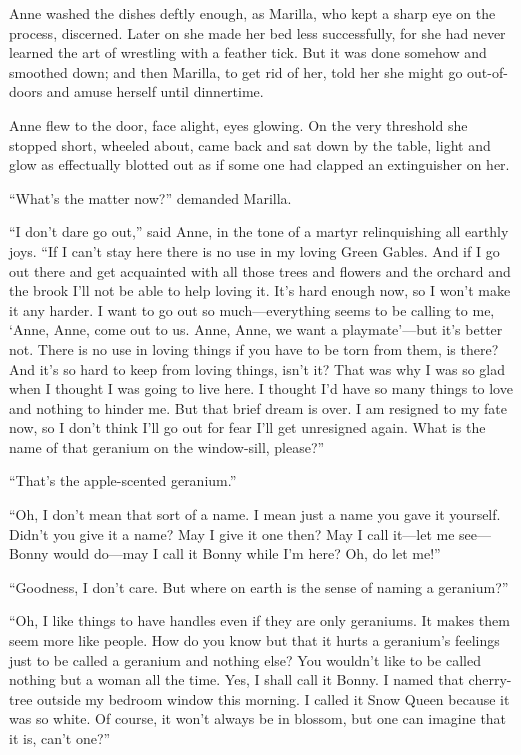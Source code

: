 \documentclass[a4paper]{article}
\begin{document}
\scriptsize{Anne washed the dishes deftly enough, as Marilla, who kept a sharp eye on the process, discerned. Later on she made her bed less successfully, for she had never learned the art of wrestling with a feather tick. But it was done somehow and smoothed down; and then Marilla, to get rid of her, told her she might go out-of-doors and amuse herself until dinnertime.

Anne flew to the door, face alight, eyes glowing. On the very threshold she stopped short, wheeled about, came back and sat down by the table, light and glow as effectually blotted out as if some one had clapped an extinguisher on her.

``What's the matter now?'' demanded Marilla.

``I don't dare go out,'' said Anne, in the tone of a martyr relinquishing all earthly joys. ``If I can't stay here there is no use in my loving Green Gables. And if I go out there and get acquainted with all those trees and flowers and the orchard and the brook I'll not be able to help loving it. It's hard enough now, so I won't make it any harder. I want to go out so much---everything seems to be calling to me, `Anne, Anne, come out to us. Anne, Anne, we want a playmate'---but it's better not. There is no use in loving things if you have to be torn from them, is there? And it's so hard to keep from loving things, isn't it? That was why I was so glad when I thought I was going to live here. I thought I'd have so many things to love and nothing to hinder me. But that brief dream is over. I am resigned to my fate now, so I don't think I'll go out for fear I'll get unresigned again. What is the name of that geranium on the window-sill, please?''}

\footnotesize{``That's the apple-scented geranium.''

``Oh, I don't mean that sort of a name. I mean just a name you gave it yourself. Didn't you give it a name? May I give it one then? May I call it---let me see---Bonny would do---may I call it Bonny while I'm here? Oh, do let me!''

``Goodness, I don't care. But where on earth is the sense of naming a geranium?''

``Oh, I like things to have handles even if they are only geraniums. It makes them seem more like people. How do you know but that it hurts a geranium's feelings just to be called a geranium and nothing else? You wouldn't like to be called nothing but a woman all the time. Yes, I shall call it Bonny. I named that cherry-tree outside my bedroom window this morning. I called it Snow Queen because it was so white. Of course, it won't always be in blossom, but one can imagine that it is, can't one?''}
\end{document}
